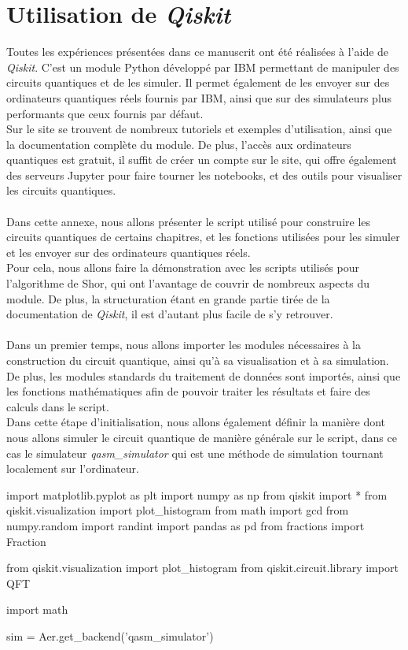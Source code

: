 \chapter{Utilisation de \emph{Qiskit}}\label{ch:qiskit}

Toutes les expériences présentées dans ce manuscrit ont été réalisées à l'aide de \emph{Qiskit}.
C'est un module Python développé par IBM permettant de manipuler des circuits quantiques et de les simuler.
Il permet également de les envoyer sur des ordinateurs quantiques réels fournis par IBM, ainsi que sur des
simulateurs plus performants que ceux fournis par défaut.\\
Sur le site se trouvent de nombreux tutoriels et exemples d'utilisation, ainsi que la documentation complète
du module.
De plus, l'accès aux ordinateurs quantiques est gratuit, il suffit de créer un compte sur le site, qui offre
également des serveurs Jupyter pour faire tourner les notebooks, et des outils pour visualiser les circuits
quantiques.\\ \\
Dans cette annexe, nous allons présenter le script utilisé pour construire les circuits quantiques
de certains chapitres, et les fonctions utilisées pour les simuler et les envoyer sur des ordinateurs
quantiques réels.\\
Pour cela, nous allons faire la démonstration avec les scripts utilisés pour l'algorithme de Shor,
qui ont l'avantage de couvrir de nombreux aspects du module.
De plus, la structuration étant en grande partie tirée de la documentation de \emph{Qiskit}, il est d'autant
plus facile de s'y retrouver.\\ \\
Dans un premier temps, nous allons importer les modules nécessaires à la construction du circuit quantique,
ainsi qu'à sa visualisation et à sa simulation.
De plus, les modules standards du traitement de données sont importés, ainsi que les fonctions mathématiques
afin de pouvoir traiter les résultats et faire des calculs dans le script.\\
Dans cette étape d'initialisation, nous allons également définir la manière dont nous allons simuler le
circuit quantique de manière générale sur le script, dans ce cas le simulateur \emph{qasm\_simulator}
qui est une méthode de simulation tournant localement sur l'ordinateur.\\

\begin{pyin}
import matplotlib.pyplot as plt
import numpy as np
from qiskit import *
from qiskit.visualization import plot_histogram
from math import gcd
from numpy.random import randint
import pandas as pd
from fractions import Fraction

from qiskit.visualization import plot_histogram
from qiskit.circuit.library import QFT

import math

sim = Aer.get_backend('qasm_simulator')
\end{pyin}

